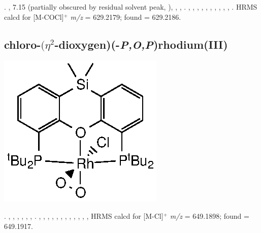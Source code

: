 .
,
7.15 (partially obscured by residual solvent peak, \CtBuaH),
,
,
.
,
,
,
,
,
,
,
,
,
,
.
HRMS calcd for  [M-COCl]$^+$ \emph{m/z} = 629.2179; found = 629.2186.



\subsection*{chloro-$(\eta^2$-dioxygen)(\tBusixantphosk-\emph{P,O,P})rhodium(III)}

\begin{structure}[h]
\begin{center}
\includegraphics{../Structures/SitBuRhClO2.eps}
\end{center}
\end{structure}

.
,
,
,
,
,
,
.
,
,
,
,
,
,
,
,
,
,
,
,
HRMS calcd for  [M-Cl]$^+$ \emph{m/z} = 649.1898; found = 649.1917.

